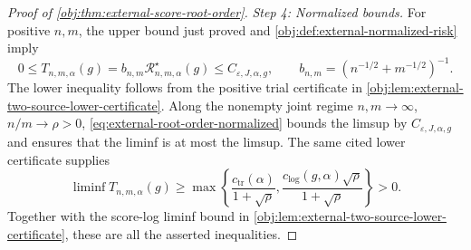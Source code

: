 \begin{proof}[Proof of \cref{obj:thm:external-score-root-order}]
\emph{Step 4: Normalized bounds.}
For positive \(n,m\), the upper bound just proved and \cref{obj:def:external-normalized-risk} imply
\[
0\leq T_{n,m,\alpha}(g)
=b_{n,m}\mathcal R^\star_{n,m,\alpha}(g)
\leq C_{\varepsilon,J,\alpha,g},
\qquad
b_{n,m}=(n^{-1/2}+m^{-1/2})^{-1}. \label{eq:external-root-order-normalized}
\]
The lower inequality follows from the positive trial certificate in \cref{obj:lem:external-two-source-lower-certificate}. Along the nonempty joint regime \(n,m\to\infty\), \(n/m\to\rho>0\), \cref{eq:external-root-order-normalized} bounds the limsup by \(C_{\varepsilon,J,\alpha,g}\) and ensures that the liminf is at most the limsup. The same cited lower certificate supplies
\[
\liminf T_{n,m,\alpha}(g)\geq
\max\left\{
\frac{c_{\mathrm{tr}}(\alpha)}{1+\sqrt\rho},
\frac{c_{\mathrm{log}}(g,\alpha)\sqrt\rho}{1+\sqrt\rho}
\right\}>0.
\]
Together with the score-log liminf bound in \cref{obj:lem:external-two-source-lower-certificate}, these are all the asserted inequalities. %
\end{proof}
